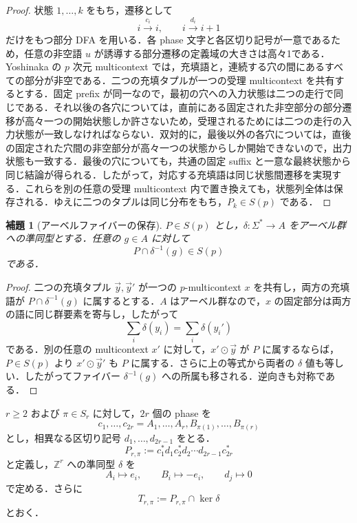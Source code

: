 \documentclass[11pt,a4paper]{ltjsarticle}
\numberwithin{equation}{section}
\theoremstyle{plain}
\newtheorem{lemma}[theorem]{補題}
\theoremstyle{definition}
\theoremstyle{remark}
\newcommand{\tuple}[1]{\vec{#1}}
\begin{document}
\begin{proof}
状態 $1,\ldots,k$ をもち，遷移として
\[
  i\xrightarrow{c_i}i,
  \qquad
  i\xrightarrow{d_i}i+1
\]
だけをもつ部分 DFA を用いる．各 phase 文字と各区切り記号が一意であるため，任意の非空語 $u$ が誘導する部分遷移の定義域の大きさは高々1である．Yoshinaka の $p$ 次元 multicontext では，充填語と，連続する穴の間にあるすべての部分が非空である．二つの充填タプルが一つの受理 multicontext を共有するとする．固定 prefix が同一なので，最初の穴への入力状態は二つの走行で同じである．それ以後の各穴については，直前にある固定された非空部分の部分遷移が高々一つの開始状態しか許さないため，受理されるためには二つの走行の入力状態が一致しなければならない．双対的に，最後以外の各穴については，直後の固定された穴間の非空部分が高々一つの状態からしか開始できないので，出力状態も一致する．最後の穴についても，共通の固定 suffix と一意な最終状態から同じ結論が得られる．したがって，対応する充填語は同じ状態間遷移を実現する．これらを別の任意の受理 multicontext 内で置き換えても，状態列全体は保存される．ゆえに二つのタプルは同じ分布をもち，$P_k\in S(p)$ である．
\end{proof}

\begin{lemma}[アーベルファイバーの保存]
\label{lem:abelian-fiber-preservation}
$P\in S(p)$ とし，$\delta:\Sigma^*\to A$ をアーベル群への準同型とする．任意の $g\in A$ に対して
\[
  P\cap\delta^{-1}(g)\in S(p)
\]
である．
\end{lemma}

\begin{proof}
二つの充填タプル $\tuple y,\tuple y'$ が一つの $p$-multicontext $x$ を共有し，両方の充填語が $P\cap\delta^{-1}(g)$ に属するとする．$A$ はアーベル群なので，$x$ の固定部分は両方の語に同じ群要素を寄与し，したがって
\[
  \sum_i\delta(y_i)=\sum_i\delta(y_i')
\]
である．別の任意の multicontext $x'$ に対して，$x'\odot\tuple y$ が $P$ に属するならば，$P\in S(p)$ より $x'\odot\tuple y'$ も $P$ に属する．さらに上の等式から両者の $\delta$ 値も等しい．したがってファイバー $\delta^{-1}(g)$ への所属も移される．逆向きも対称である．
\end{proof}

$r\ge2$ および $\pi\in S_r$ に対して，$2r$ 個の phase を
\[
  c_1,\ldots,c_{2r}
  =A_1,\ldots,A_r,B_{\pi(1)},\ldots,B_{\pi(r)}
\]
とし，相異なる区切り記号 $d_1,\ldots,d_{2r-1}$ をとる．
\[
  P_{r,\pi}:=c_1^*d_1c_2^*d_2\cdots d_{2r-1}c_{2r}^*
\]
と定義し，$\mathbb Z^r$ への準同型 $\delta$ を
\[
  A_i\mapsto e_i,
  \qquad
  B_i\mapsto -e_i,
  \qquad
  d_j\mapsto0
\]
で定める．さらに
\[
  T_{r,\pi}:=P_{r,\pi}\cap\ker\delta
\]
とおく．
\end{document}
